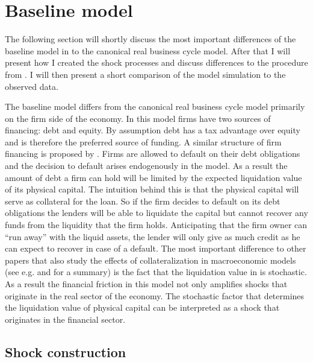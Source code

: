 \section{Baseline model}
\label{sec:baseline_model}

The following section will shortly discuss the most important differences of
the baseline model in \textcite{jerman_macroeconomic_2012} to the canonical
real business cycle model. After that I will present how I created the shock
processes and discuss differences to the procedure from
\citeauthor{jerman_macroeconomic_2012}. I will then present a short comparison
of the model simulation to the observed data.


The baseline model differs from the canonical real business cycle model
primarily on the firm side of the economy. In this model firms have two sources
of financing: debt and equity. By assumption debt has a tax advantage over
equity and is therefore the preferred source of funding. A similar structure of
firm financing is proposed by \textcite{hennessy_debt_2005}. Firms are allowed
to default on their debt obligations and the decision to default arises
endogenously in the model. As a result the amount of debt a firm can hold will
be limited by the expected liquidation value of its physical capital. The
intuition behind this is that the physical capital will serve as collateral for
the loan. So if the firm decides to default on its debt obligations the lenders
will be able to liquidate the capital but cannot recover any funds from the
liquidity that the firm holds. Anticipating that the firm owner can ``run
away'' with the liquid assets, the lender will only give as much credit as he
can expect to recover in case of a default. The most important difference to
other papers that also study the effects of collateralization in macroeconomic
models (see e.g. \textcite{kiyotaki_credit_1997} and
\textcite{quadrini_financial_2011} for a summary) is the fact that the
liquidation value in \textcite{jerman_macroeconomic_2012} is stochastic. As a
result the financial friction in this model not only amplifies shocks that
originate in the real sector of the economy. The stochastic factor that
determines the liquidation value of physical capital can be interpreted as a
shock that originates in the financial sector.

\subsection{Shock construction}
\label{sec:shock_construction}

